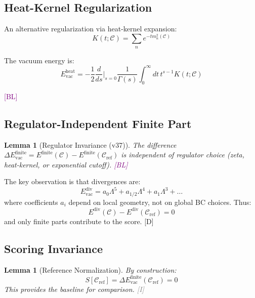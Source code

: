 \documentclass[11pt,a4paper]{article}
\newtheorem{lemma}[theorem]{Lemma}
\newcommand{\tagD}{\textcolor{blue!70!black}{[D]}}
\newcommand{\tagI}{\textcolor{gray}{[I]}}
\newcommand{\tagBL}{\textcolor{purple}{[BL]}}
\begin{document}
\subsection{Heat-Kernel Regularization}

An alternative regularization via heat-kernel expansion:
\begin{equation}
\label{eq:heat-kernel}
K(t; \mathcal{C}) = \sum_n e^{-t m_n^2(\mathcal{C})}
\end{equation}

The vacuum energy is:
\begin{equation}
\label{eq:vac-heat}
E_{\text{vac}}^{\text{heat}} = -\frac{1}{2} \frac{d}{ds}\bigg|_{s=0} \frac{1}{\Gamma(s)}
\int_0^\infty dt\, t^{s-1} K(t; \mathcal{C})
\end{equation}

\tagBL

\subsection{Regulator-Independent Finite Part}

\begin{lemma}[Regulator Invariance (v37)]
\label{lem:reg-inv}
The difference $\Delta E_{\text{vac}}^{\text{finite}} = E^{\text{finite}}(\mathcal{C}) - E^{\text{finite}}(\mathcal{C}_{\text{ref}})$
is independent of regulator choice (zeta, heat-kernel, or exponential cutoff). \tagBL
\end{lemma}

The key observation is that divergences are:
\begin{equation}
\label{eq:divergence-structure}
E_{\text{vac}}^{\text{div}} = a_0 \Lambda^5 + a_{1/2} \Lambda^4 + a_1 \Lambda^3 + \ldots
\end{equation}
where coefficients $a_i$ depend on local geometry, not on global BC choices.
Thus:
\begin{equation}
\label{eq:div-cancel}
E^{\text{div}}(\mathcal{C}) - E^{\text{div}}(\mathcal{C}_{\text{ref}}) = 0
\end{equation}
and only finite parts contribute to the score. \tagD

\subsection{Scoring Invariance}

\begin{lemma}[Reference Normalization]
\label{lem:ref-norm}
By construction:
\begin{equation}
\label{eq:ref-norm}
S[\mathcal{C}_{\text{ref}}] = \Delta E_{\text{vac}}^{\text{finite}}(\mathcal{C}_{\text{ref}}) = 0
\end{equation}
This provides the baseline for comparison. \tagI
\end{lemma}
\end{document}
